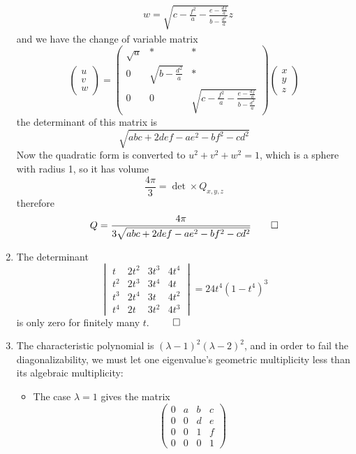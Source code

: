 \begin{enumerate}
\begin{align*}
        &w = \sqrt{c-\frac{f^2}{a} - \frac{e-\frac{df}{a}}{b-\frac{d^2}{a}}}z
    \end{align*}
    and we have the change of variable matrix
    \[
    \begin{pmatrix}
        u \\ v \\ w
    \end{pmatrix}	
    = 
    \begin{pmatrix}
        \sqrt{a} & * & * \\ 
        0 & \sqrt{b-\frac{d^2}{a}} & * \\ 
        0 & 0 & \sqrt{c-\frac{f^2}{a} - \frac{e-\frac{df}{a}}{b-\frac{d^2}{a}}}
    \end{pmatrix}
    \begin{pmatrix}
        x \\ y \\ z
    \end{pmatrix}
    \]
    the determinant of this matrix is 
    \[
    \sqrt{abc+2def-ae^2-bf^2-cd^2}
    \]
    Now the quadratic form is converted to $u^2 + v^2 + w^2 = 1$, which is a sphere with radius 1, so it has volume
    \[
    \frac{4\pi}{3} = \det \times Q_{x,y,z}
    \]
    therefore
    \[
    Q = \frac{4\pi}{3\sqrt{abc+2def-ae^2-bf^2-cd^2}} \qed
    \]
    \item The determinant
    \[
    \begin{vmatrix}
        t & 2t^2 & 3t^3 & 4t^4 \\
        t^2 & 2t^3 & 3t^4 & 4t \\ 
        t^3 & 2t^4 & 3t & 4t^2 \\
        t^4 & 2t & 3t^2 & 4t^3 
    \end{vmatrix} = 24t^4 (1-t^4)^3
    \]
    is only zero for finitely many $t$. $\qed$
    \item The characteristic polynomial is $(\lambda-1)^2(\lambda-2)^2$, and in order to fail the diagonalizability, we must let one eigenvalue's geometric multiplicity less than its algebraic multiplicity:
    \begin{itemize}
        \item The case $\lambda = 1$ gives the matrix
        \[
        \begin{pmatrix}
            0 & a & b & c \\
            0 & 0 & d & e \\
            0 & 0 & 1 & f \\
            0 & 0 & 0 & 1
        \end{pmatrix}
\]
\end{itemize}
\end{enumerate}
